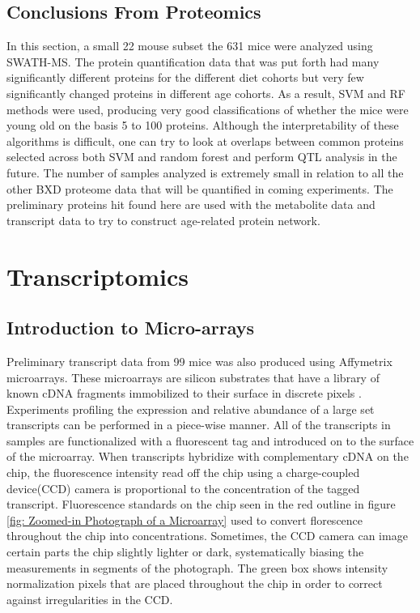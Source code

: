 \documentclass[a4paper,11pt,twoside]{book}
\begin{document}
	
	\section{Conclusions From Proteomics}
	
    In this section, a small 22 mouse subset the 631 mice were analyzed using SWATH-MS. The protein quantification data that was put forth had many significantly different proteins for the different diet cohorts but very few significantly changed proteins in different age cohorts. As a result, SVM and RF methods were used, producing very good classifications of whether the mice were young old on the basis 5 to 100 proteins. Although the interpretability of these algorithms is difficult, one can try to look at overlaps between common proteins selected across both SVM and random forest and perform QTL analysis in the future. The number of samples analyzed is extremely small in relation to all the other BXD proteome data that will be quantified in coming experiments. The preliminary proteins hit found here are used with the metabolite data and transcript data to try to construct age-related protein network. 
	
	\chapter{Transcriptomics}
	
	\section{Introduction to Micro-arrays}
	
    Preliminary transcript data from 99 mice was also produced using Affymetrix microarrays. These microarrays are silicon substrates that have a library of known cDNA fragments immobilized to their surface in discrete pixels \citep{Miller2009MicroArrays}.  Experiments profiling the expression and relative abundance of a large set transcripts can be performed in a piece-wise manner. All of the transcripts in samples are functionalized with a fluorescent tag and introduced on to the surface of the microarray. When transcripts hybridize with complementary cDNA on the chip, the fluorescence intensity read off the chip using a charge-coupled device(CCD) camera is proportional to the concentration of the tagged transcript. Fluorescence standards on the chip seen in the red outline in figure \ref{fig: Zoomed-in Photograph of a Microarray} used to convert florescence throughout the chip into concentrations. Sometimes, the CCD camera can image certain parts the chip slightly lighter or dark, systematically biasing the measurements in segments of the photograph. The green box shows intensity normalization pixels that are placed throughout the chip in order to correct against irregularities in the CCD. 
	
\end{document}
